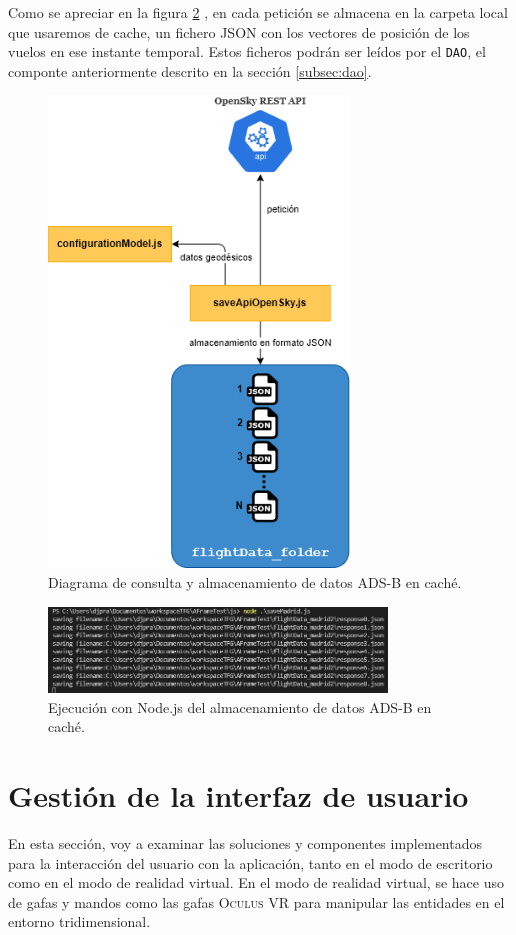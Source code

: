 \documentclass[a4paper, 11pt]{book}
\begin{document}
Como se apreciar en la figura \ref{fig:capturaDatosCache} , en cada petición se almacena en la carpeta local que usaremos de cache, un fichero \textsc{\gls{JSON}} con los vectores de posición de los vuelos en ese instante temporal.
Estos ficheros podrán ser leídos por el \texttt{DAO}, el componte anteriormente descrito en la sección \ref{subsec:dao}.
\begin{figure}[h]
  \centering
  \includegraphics[width=8cm, keepaspectratio]{img/almacenamientoCache.drawio.png}
  \caption{Diagrama de consulta y almacenamiento de datos ADS-B en caché.}
  \label{fig:saveApiData}
\end{figure}
\begin{figure}[h]
  \centering
  \includegraphics[width=9cm, keepaspectratio]{img/captura_datos_madrid.jpg}
  \caption{Ejecución con Node.js del almacenamiento de datos ADS-B en caché.}
  \label{fig:capturaDatosCache}
\end{figure}
\clearpage
\section{Gestión de la interfaz de usuario}
\label{sec:gui}
En esta sección, voy a examinar las soluciones y componentes implementados para la interacción del usuario con la aplicación, tanto en el modo de escritorio como en el modo de realidad virtual. En el modo de realidad virtual, se hace uso de gafas y mandos como las gafas \textsc{Oculus VR} para manipular las entidades en el entorno tridimensional.
\end{document}
